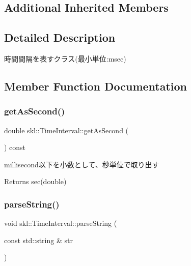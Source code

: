 \subsection*{Additional Inherited Members}


\subsection{Detailed Description}
時間間隔を表すクラス(最小単位\+:msec) 

\subsection{Member Function Documentation}
\hypertarget{classskl_1_1_time_interval_afa1dd3e11159f1f8886e83db1c11eb5a}{}\label{classskl_1_1_time_interval_afa1dd3e11159f1f8886e83db1c11eb5a} 
\subsubsection{\texorpdfstring{get\+As\+Second()}{getAsSecond()}}
{\footnotesize\ttfamily double skl\+::\+Time\+Interval\+::get\+As\+Second (\begin{DoxyParamCaption}{ }\end{DoxyParamCaption}) const}



millisecond以下を小数として、秒単位で取り出す 

\begin{DoxyReturn}{Returns}
sec(double) 
\end{DoxyReturn}
\hypertarget{classskl_1_1_time_interval_ae706d4ce4795c566ce481f96380a878f}{}\label{classskl_1_1_time_interval_ae706d4ce4795c566ce481f96380a878f} 
\subsubsection{\texorpdfstring{parse\+String()}{parseString()}}
{\footnotesize\ttfamily void skl\+::\+Time\+Interval\+::parse\+String (\begin{DoxyParamCaption}\item[{const std\+::string \&}]{str }\end{DoxyParamCaption})}



